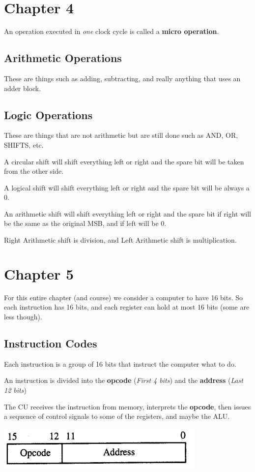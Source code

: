 \documentclass[12pt,letterpaper]{article} \usepackage{amsmath} \usepackage{graphicx} \usepackage[margin=1in]{geometry} \usepackage{longtable}  \usepackage{amssymb}
\begin{document}
		\section{Chapter 4}
		
		An operation executed in \textit{one} clock cycle is called a \textbf{micro operation}.
		
		\subsection{Arithmetic Operations}
		These are things such as adding, subtracting, and really anything that uses an adder block.
		
		\subsection{Logic Operations}
		These are things that are not arithmetic but are still done such as AND, OR, SHIFTS, etc.
		
		A circular shift will shift everything left or right and the spare bit will be taken from the other side.
		
		A logical shift will shift everything left or right and the spare bit will be always a 0.
		
		An arithmetic shift will shift everything left or right and the spare bit if right will be the same as the original MSB, and if left will be 0.
		
		Right Arithmetic shift is division, and Left Arithmetic shift is multiplication.
		
		\section {Chapter 5}
		For this entire chapter (and course) we consider a computer to have 16 bits. So each instruction has 16 bits, and each register can hold at most 16 bits (some are less though).
		
			\subsection{Instruction Codes}
			Each instruction is a group of 16 bits that instruct the computer what to do. 
			
			An instruction is divided into the \textbf{opcode }(\textit{First 4 bits}) and the \textbf{address }(\textit{Last 12 bits})
			
			The CU receives the instruction from memory, interprets the \textbf{opcode}, then issues a sequence of control signals to some of the registers, and maybe the ALU. 
			\begin{center}
				\includegraphics[width=0.3\linewidth]{opcode}
			\end{center}
			
\end{document}
